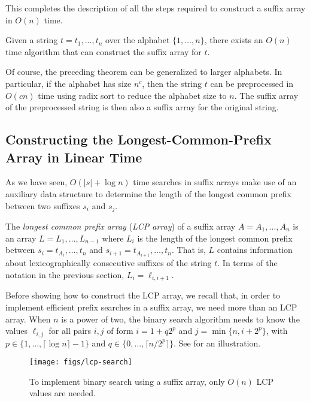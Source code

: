 This completes the description of all the steps required to construct a suffix array in $O(n)$ time.

\begin{thm}
  Given a string $t=t_1,\ldots,t_n$ over the alphabet $\{1,\ldots,n\}$,
  there exists an $O(n)$ time algorithm that can construct the suffix
  array for $t$.
\end{thm}

Of course, the preceding theorem can be generalized to larger
alphabets. In particular, if the alphabet has size $n^c$, then the string
$t$ can be preprocessed in $O(cn)$ time using radix sort to reduce the
alphabet size to $n$.  The suffix array of the preprocessed string is then also a suffix array for the original string.

\subsection{Constructing the Longest-Common-Prefix Array in Linear Time}

As we have seen, $O(|s|+\log n)$ time searches in suffix arrays make use
of an auxiliary data structure to determine the length of the longest
common prefix between two suffixes $s_i$ and $s_j$.

The \emph{longest common prefix array} (\emph{LCP array}) of a suffix
array $A=A_1,\ldots,A_n$ is an array $L=L_1,\ldots,L_{n-1}$ where $L_i$ is
the length of the longest common prefix between $s_i=t_{A_i},\ldots,t_n$
and $s_{i+1}=t_{A_{i+1}},\ldots,t_n$.  That is, $L$ contains information
about lexicographically consecutive suffixes of the string $t$.  In terms
of the notation in the previous section, $L_i=\ell_{i,i+1}$.

Before showing how to construct the LCP array, we recall that, in order
to implement efficient prefix searches in a suffix array, we need more
than an LCP array.  When $n$ is a power of two, the binary search
algorithm needs to know the values $\ell_{i,j}$ for all pairs $i,j$
of form $i=1+q2^p$ and $j=\min\{n,i+2^{p}\}$, with $p\in\{1,\ldots,\lceil \log
n\rceil-1\}$ and $q\in\{0,\ldots,\lceil n/2^p\rceil\}$.  See  for an illustration.

\begin{figure}
  \begin{center}
    \texttt{[image: figs/lcp-search]}
  \end{center}
  \caption{To implement binary search using a suffix array, only $O(n)$ LCP values are needed.}
\end{figure}

